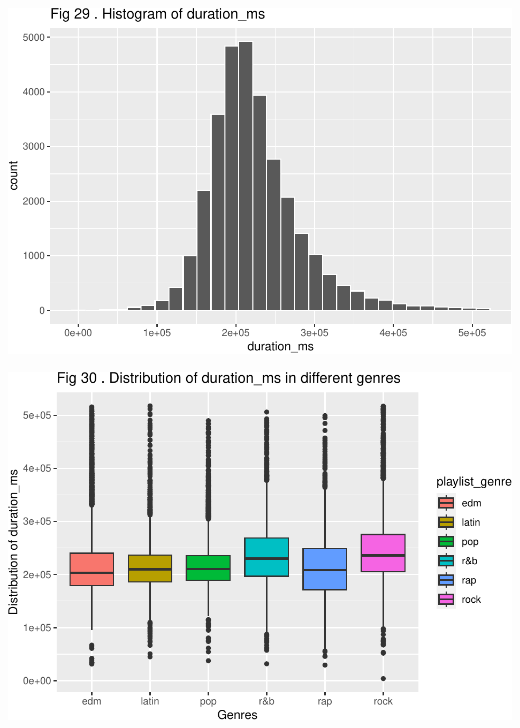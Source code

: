 \documentclass[
]{article}
\begin{document}
\includegraphics{Final-Report_files/figure-latex/unnamed-chunk-14-25.pdf}

\includegraphics{Final-Report_files/figure-latex/unnamed-chunk-14-26.pdf}
\end{document}
